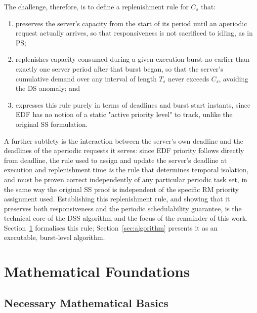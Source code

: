 \documentclass[conference]{IEEEtran}
\begin{document}
    The challenge, therefore, is to define a replenishment rule for $C_s$ that:
    \begin{enumerate}
        \item preserves the server's capacity from the start of its period until an aperiodic request actually arrives, so that responsiveness is not sacrificed to idling, as in PS;
        \item replenishes capacity consumed during a given execution burst no earlier than exactly one server period after that burst began, so that the server's cumulative demand over any interval of length $T_s$ never exceeds $C_s$, avoiding the DS anomaly; and
        \item expresses this rule purely in terms of deadlines and burst start instants, since EDF has no notion of a static "active priority level" to track, unlike the original SS formulation.
    \end{enumerate}

    A further subtlety is the interaction between the server's own deadline and the deadlines of the aperiodic requests it serves: since EDF priority follows directly from deadline, the rule used to assign and update the server's deadline at execution and replenishment time \emph{is} the rule that determines temporal isolation, and must be proven correct independently of any particular periodic task set, in the same way the original SS proof is independent of the specific RM priority assignment used. Establishing this replenishment rule, and showing that it preserves both responsiveness and the periodic schedulability guarantee, is the technical core of the DSS algorithm and the focus of the remainder of this work. Section~\ref{sec:math-basics} formalises this rule; Section~\ref{sec:algorithm} presents it as an executable, burst-level algorithm.

    \section{Mathematical Foundations}
    \label{sec:math-basics}

    \subsection{Necessary Mathematical Basics}
\end{document}
